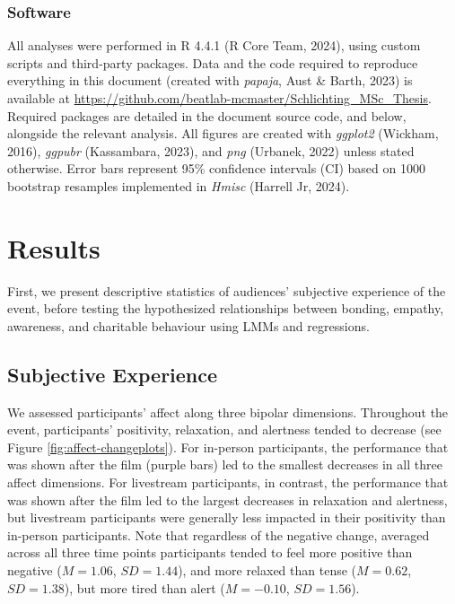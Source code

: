 \documentclass[
  man,floatsintext]{apa6}
\begin{document}
\subsubsection{Software}\label{software}

All analyses were performed in R 4.4.1 (R Core Team, 2024), using custom scripts and third-party packages. Data and the code required to reproduce everything in this document (created with \emph{papaja}, Aust \& Barth, 2023) is available at \url{https://github.com/beatlab-mcmaster/Schlichting_MSc_Thesis}. Required packages are detailed in the document source code, and below, alongside the relevant analysis. All figures are created with \emph{ggplot2} (Wickham, 2016), \emph{ggpubr} (Kassambara, 2023), and \emph{png} (Urbanek, 2022) unless stated otherwise. Error bars represent 95\% confidence intervals (CI) based on 1000 bootstrap resamples implemented in \emph{Hmisc} (Harrell Jr, 2024).

\section{Results}\label{results}

First, we present descriptive statistics of audiences' subjective experience of the event, before testing the hypothesized relationships between bonding, empathy, awareness, and charitable behaviour using LMMs and regressions.

\subsection{Subjective Experience}\label{subjective-experience-1}

We assessed participants' affect along three bipolar dimensions. Throughout the event, participants' positivity, relaxation, and alertness tended to decrease (see Figure \ref{fig:affect-changeplots}). For in-person participants, the performance that was shown after the film (purple bars) led to the smallest decreases in all three affect dimensions. For livestream participants, in contrast, the performance that was shown after the film led to the largest decreases in relaxation and alertness, but livestream participants were generally less impacted in their positivity than in-person participants. Note that regardless of the negative change, averaged across all three time points participants tended to feel more positive than negative (\(M = 1.06\), \(SD = 1.44\)), and more relaxed than tense (\(M = 0.62\), \(SD = 1.38\)), but more tired than alert (\(M = -0.10\), \(SD = 1.56\)).
\end{document}
